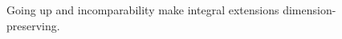 \begin{figure}[ht]\centering
{}
\caption{Going up and incomparability make integral extensions dimension-preserving.}\label{fig:vi29-08}\end{figure}
